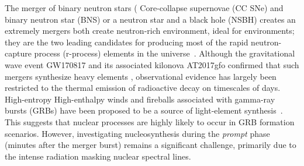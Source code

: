 \documentclass[linenumbers,twocolumn]{aastex631}
\providecommand{\DIFaddtex}[1]{{\protect\color{blue} \sf #1}} %
\providecommand{\DIFdeltex}[1]{{\protect\color{red} \scriptsize #1}} %
\providecommand{\DIFaddbegin}{} %
\providecommand{\DIFaddend}{} %
\providecommand{\DIFdelbegin}{} %
\providecommand{\DIFdelend}{} %
\providecommand{\DIFadd}[1]{\texorpdfstring{\DIFaddtex{#1}}{#1}} %
\providecommand{\DIFdel}[1]{\texorpdfstring{\DIFdeltex{#1}}{}} %
\begin{document}
\DIFdel{The merger of binary neutron stars (}\DIFdelend \DIFaddbegin \DIFadd{Core-collapse supernovae (CC SNe) and binary neutron star (}\DIFaddend BNS) \DIFdelbegin \DIFdel{or a neutron star and a black hole (NSBH) creates an extremely }\DIFdelend \DIFaddbegin \DIFadd{mergers both create }\DIFaddend neutron-rich \DIFdelbegin \DIFdel{environment, ideal for }\DIFdelend \DIFaddbegin \DIFadd{environments; they are the two leading candidates for producing most of }\DIFaddend the rapid neutron-capture process (r-process) \DIFdelbegin \DIFdel{\citep[e.g.,][]{1974ApJ...192L.145L, 1989Natur.340..126E,2018ApJ...869..130R,2019LRR....23....1M,2020ApJ...903L...3W,2024Natur.626..737L}}\DIFdelend \DIFaddbegin \DIFadd{elements in the universe~\citep[e.g.][]{1974ApJ...192L.145L, 1989Natur.340..126E,2007PhR...450...97A,2004A&A...416..997A,2014MNRAS.438.2177M,2015MNRAS.452.1970W, 2018ApJ...869..130R,2019LRR....23....1M,2020ApJ...903L...3W,2024Natur.626..737L}}\DIFaddend . Although the gravitational wave event GW170817 and its associated kilonova AT2017gfo confirmed that such mergers synthesize heavy elements \citep{2017PhRvL.119p1101A, 2019LRR....23....1M}, observational evidence has largely been restricted to the thermal emission of radioactive decay on timescales of days. \DIFdelbegin \DIFdel{High-entropy }\DIFdelend \DIFaddbegin \DIFadd{High-enthalpy }\DIFaddend winds and fireballs associated with gamma-ray bursts (GRBs) have been proposed to be a source of light-element synthesis~\citep[e.g.][]{1967ARA&A...5..525F,2001ApJ...561..957P,2000ApJ...533..424O,2001ApJ...562..887T,2002ApJ...580..368P}. This suggests that nuclear processes are highly likely to occur in GRB formation scenarios.  %
However, investigating nucleosynthesis during the \textit{prompt} phase (minutes after the \DIFdelbegin \DIFdel{merger}\DIFdelend \DIFaddbegin \DIFadd{burst}\DIFaddend ) remains a significant challenge, primarily due to the intense radiation masking nuclear spectral lines.
\end{document}
